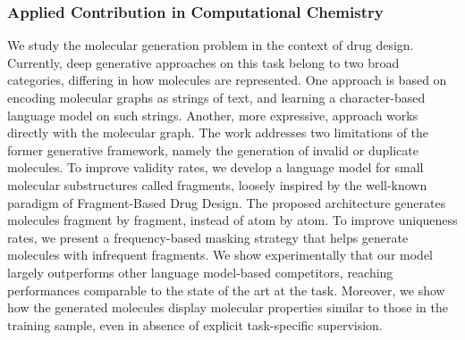 \subsubsection*{Applied Contribution in Computational Chemistry}
We study the molecular generation problem in the context of drug design. Currently, deep generative approaches on this task belong to two broad categories, differing in how molecules are represented. One approach is based on encoding molecular graphs as strings of text, and learning a character-based language model on such strings. Another, more expressive, approach works directly with the molecular graph. The work addresses two limitations of the former generative framework, namely the generation of invalid or duplicate molecules. To improve validity rates, we develop a language model for small molecular substructures called fragments, loosely inspired by the well-known paradigm of Fragment-Based Drug Design. The proposed architecture generates molecules fragment by fragment, instead of atom by atom. To improve uniqueness rates, we present a frequency-based masking strategy that helps generate molecules with infrequent fragments. We show experimentally that our model largely outperforms other language model-based competitors, reaching performances comparable to the state of the art at the task. Moreover, we show how the generated molecules display molecular properties similar to those in the training sample, even in absence of explicit task-specific supervision.

